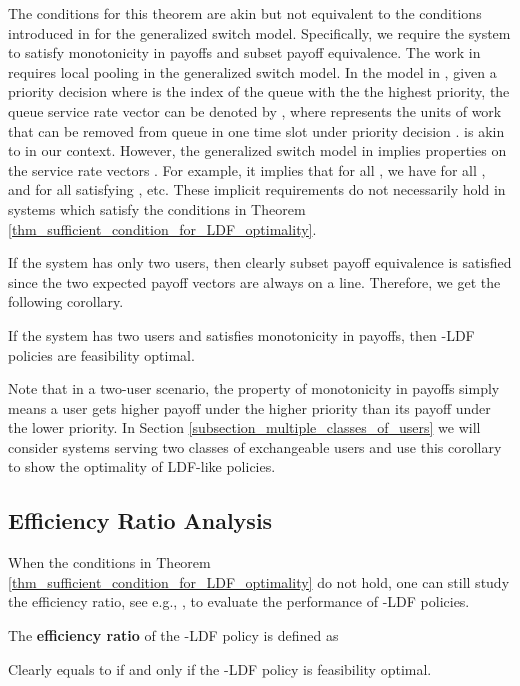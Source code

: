 \documentclass[prodmode,acmtompecs]{acmsmall}
\begin{document}
The conditions for this theorem are akin but not equivalent to the conditions introduced in \cite{DiW06} for the generalized switch model. 
Specifically, we require the system to satisfy monotonicity in payoffs and subset payoff equivalence. The work in \cite{DiW06} requires local pooling in the generalized switch model. 
In the model in \cite{DiW06}, given a priority decision  where  is the index of the queue with the the  highest priority, the queue service rate vector can be denoted by , where  represents the units of work that can be removed from queue  in one time slot under priority decision .  is akin to  in our context. However, the generalized switch model in \cite{DiW06} implies properties on the service rate vectors . For example, it implies that for all , we have  for all , and  for all  satisfying , etc. These implicit requirements do not necessarily hold in systems which satisfy the conditions in Theorem \ref{thm_sufficient_condition_for_LDF_optimality}. 

If the system has only two users, then clearly subset payoff equivalence is satisfied since the two expected payoff vectors are always on a line. Therefore, we get the following corollary. 
\begin{corollary}
\label{corollary_two_user_optimality}
If the system has two users and satisfies monotonicity in payoffs, then -LDF policies are feasibility optimal. 
\end{corollary}

Note that in a two-user scenario, the property of monotonicity in payoffs simply means a user gets higher payoff under the higher priority than its payoff under the lower priority. 
In Section \ref{subsection_multiple_classes_of_users} we will consider systems serving two classes of exchangeable users and use this corollary to show the optimality of LDF-like policies. 

\subsection{Efficiency Ratio Analysis}

When the conditions in Theorem \ref{thm_sufficient_condition_for_LDF_optimality} do not hold, one can still study the efficiency ratio, see e.g., \cite{JLS07}, to evaluate the performance of -LDF policies. 
\begin{definition}
The {\bf efficiency ratio} of the -LDF policy is defined as

\end{definition}
Clearly  equals to  if and only if the -LDF policy is feasibility optimal. 
\end{document}
